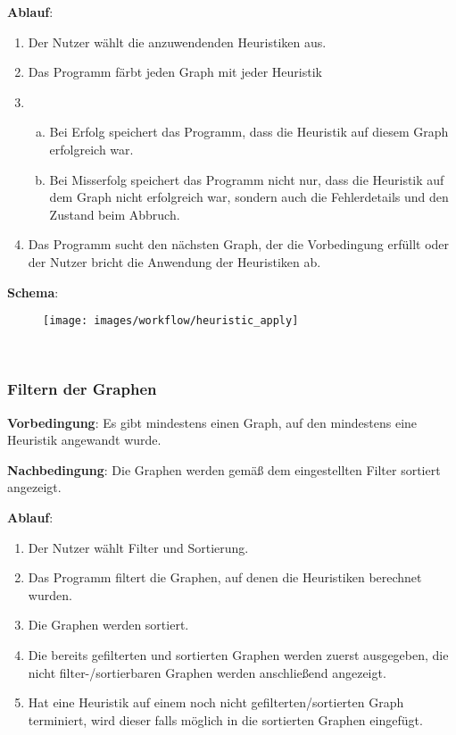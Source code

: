 \documentclass{article}
\begin{document}
	\textbf{Ablauf}:
	\begin{enumerate}[1)]
		\item{Der Nutzer wählt die anzuwendenden Heuristiken aus.}
		\item{Das Programm färbt jeden Graph mit jeder Heuristik}
		\item{
			\begin{enumerate}[a)]
				\item{Bei Erfolg speichert das Programm, dass die Heuristik auf diesem Graph erfolgreich war.}
				\item{Bei Misserfolg speichert das Programm nicht nur, dass die Heuristik auf dem Graph nicht erfolgreich war, sondern auch die Fehlerdetails und den Zustand beim Abbruch.}
			\end{enumerate}
		}
		\item{Das Programm sucht den nächsten Graph, der die Vorbedingung erfüllt oder der Nutzer bricht die Anwendung der Heuristiken ab.}
	\end{enumerate}
	
	\textbf{Schema}:
	~\begin{figure}[!h]
		\centering
		\texttt{[image: images/workflow/heuristic\_apply]}
	\end{figure}
	
	
	
	
	~\newpage
	\subsubsection{Filtern der Graphen}
	\textbf{Vorbedingung}: Es gibt mindestens einen Graph, auf den mindestens eine Heuristik angewandt wurde.
	
	\textbf{Nachbedingung}: Die Graphen werden gemäß dem eingestellten Filter sortiert angezeigt.
	
	\textbf{Ablauf}:
	\begin{enumerate}[1)]
		\item{Der Nutzer wählt Filter und Sortierung.}
		\item{Das Programm filtert die Graphen, auf denen die Heuristiken berechnet wurden.}
		\item{Die Graphen werden sortiert.}
		\item{Die bereits gefilterten und sortierten Graphen werden zuerst ausgegeben, die nicht filter-/sortierbaren Graphen werden anschließend angezeigt.}
		\item{Hat eine Heuristik auf einem noch nicht gefilterten/sortierten Graph terminiert, wird dieser falls möglich in die sortierten Graphen eingefügt.}
	\end{enumerate}
	
\end{document}
